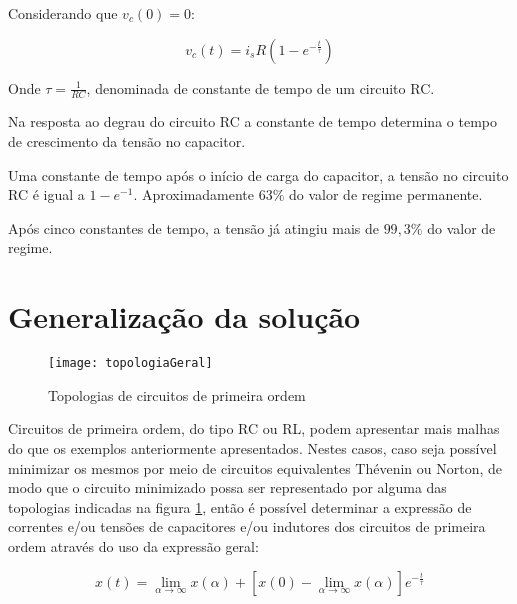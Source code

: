 \documentclass[12pt,fleqn]{book} %
\begin{document}
{Considerando que $v_c(0) = 0$:

\begin{equation}
v_c(t) = i_sR(1-e^{-\frac{t}{\tau}})
\end{equation}

Onde $\tau=\frac{1}{RC}$, denominada de constante de tempo de um circuito RC.

\begin{remark}
Na resposta ao degrau do circuito RC a constante de tempo determina o tempo de crescimento da tensão no capacitor.
\end{remark}

\begin{remark}
Uma constante de tempo após o início de carga do capacitor, a tensão no circuito RC é igual a $1-e^{-1}$. Aproximadamente $63\%$ do valor de regime permanente.
\end{remark}

\begin{remark}
Após cinco constantes de tempo, a tensão já atingiu mais de $99,3\%$ do valor de regime.
\end{remark}
     
    \section{Generalização da solução}
    
  \begin{figure}[!htbp] \centering\texttt{[image: topologiaGeral]}
            \caption{Topologias de circuitos de primeira ordem}\label{topologiaGeral} 
        \end{figure}    
    
    Circuitos de primeira ordem, do tipo RC ou RL, podem apresentar mais malhas do que os exemplos anteriormente apresentados. Nestes casos, caso seja possível minimizar os mesmos por meio de circuitos equivalentes Thévenin ou Norton, de modo que o circuito minimizado possa ser representado por alguma das topologias indicadas na figura \ref{topologiaGeral}, então é possível determinar a expressão de correntes e/ou tensões de capacitores e/ou indutores dos circuitos de primeira ordem através do uso da expressão geral:
    
    \begin{equation}
    x(t)=\lim_{\alpha\rightarrow\infty} x(\alpha)+[x(0)-\lim_{\alpha\rightarrow\infty}x(\alpha)] e^{-\frac{t}{\tau}}
    \end{equation}

}
\end{document}
